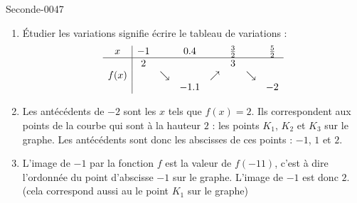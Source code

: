\begin{corrige}{Seconde-0047}
\begin{enumerate}
        \item
            Étudier les variations signifie écrire le tableau de variations :
            \begin{equation*}
                \begin{array}[]{c|ccccccc}
                    x&-1&&0.4&&\frac{ 3 }{2}&&\frac{ 5 }{2}\\
                    \hline
                    &2&&&&3&&\\
                    f(x)&&\searrow&&\nearrow&&\searrow&\\
                    &&&-1.1&&&&-2\\
                \end{array}
            \end{equation*}
        \item
            Les antécédents de \( -2\) sont les \( x\) tels que \( f(x)=2\). Ils correspondent aux points de la courbe qui sont à la hauteur \( 2\) : les points \( K_1\), \( K_2\) et \( K_3\) sur le graphe. Les antécédents sont donc les abscisses de ces points : \( -1\), \( 1 \) et \( 2\).
        \item
            L'image de \( -1\) par la fonction \( f\) est la valeur de \( f(-11)\), c'est à dire l'ordonnée du point d'abscisse \( -1\) sur le graphe. L'image de \( -1 \) est donc \( 2\). (cela correspond aussi au le point \( K_1\) sur le graphe)
    \end{enumerate}

\end{corrige}
